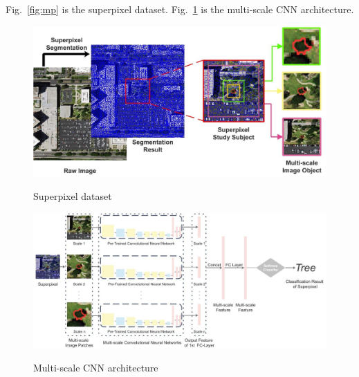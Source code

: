 \documentclass[]{IEEEtran}
\begin{document}
	Fig.~\ref{fig:mp} is the superpixel dataset. Fig.~\ref{fig:ss} is the multi-scale CNN architecture.

\newpage
\begin{figure}[!hbt]
		\vspace{2cm}
		\begin{center}
			\includegraphics[width=\columnwidth]{superpixel_dataset}
			\caption{Superpixel dataset}
			\label{fig:mp}
		    \vspace{1cm}
			\includegraphics[width=\columnwidth]{multi-scale_CNN}
			\caption{Multi-scale CNN architecture}
			\label{fig:ss}
		\end{center}
	\end{figure}

\end{document}
